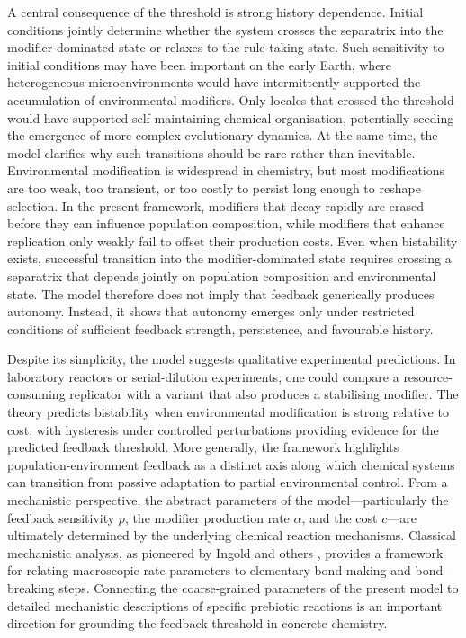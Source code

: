 \documentclass[11pt]{article}
\newcommand{\rev}[1]{#1}
\begin{document}
A central consequence of the threshold is strong history dependence. Initial conditions jointly determine whether the system crosses the separatrix into the modifier-dominated state or relaxes to the rule-taking state. Such sensitivity to initial conditions may have been important on the early Earth, where heterogeneous microenvironments would have intermittently supported the accumulation of environmental modifiers. Only locales that crossed the threshold would have supported self-maintaining chemical organisation, potentially seeding the emergence of more complex evolutionary dynamics. At the same time, the model clarifies why such transitions should be rare rather than inevitable. Environmental modification is widespread in chemistry, but most modifications are too weak, too transient, or too costly to persist long enough to reshape selection. In the present framework, modifiers that decay rapidly are erased before they can influence population composition, while modifiers that enhance replication only weakly fail to offset their production costs. Even when bistability exists, successful transition into the modifier-dominated state requires crossing a separatrix that depends jointly on population composition and environmental state. The model therefore does not imply that feedback generically produces autonomy. Instead, it shows that autonomy emerges only under restricted conditions of sufficient feedback strength, persistence, and favourable history.

Despite its simplicity, the model suggests qualitative experimental predictions. In laboratory reactors or serial-dilution experiments, one could compare a resource-consuming replicator with a variant that also produces a stabilising modifier. The theory predicts bistability when environmental modification is strong relative to cost, with hysteresis under controlled perturbations providing evidence for the predicted feedback threshold. More generally, the framework highlights population-environment feedback as a distinct axis along which chemical systems can transition from passive adaptation to partial environmental control. \rev{From a mechanistic perspective, the abstract parameters of the model---particularly the feedback sensitivity $p$, the modifier production rate $\alpha$, and the cost $c$---are ultimately determined by the underlying chemical reaction mechanisms. Classical mechanistic analysis, as pioneered by Ingold and others \citep{Ingold1953}, provides a framework for relating macroscopic rate parameters to elementary bond-making and bond-breaking steps. Connecting the coarse-grained parameters of the present model to detailed mechanistic descriptions of specific prebiotic reactions is an important direction for grounding the feedback threshold in concrete chemistry.}
\end{document}
